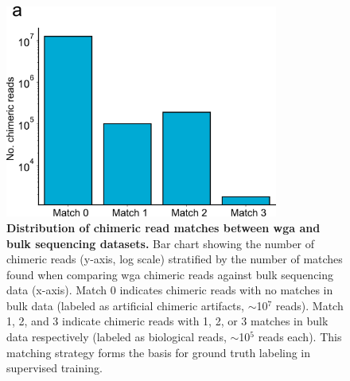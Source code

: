 \documentclass[pdflatex,sn-nature]{sn-jnl}%
\theoremstyle{thmstyleone}%
\theoremstyle{thmstyletwo}%
\theoremstyle{thmstylethree}%
\begin{document}
\begin{figure}[!ht]
	\begin{center}
		\includegraphics[width=0.8\textwidth]{final_figures/sf1}
	\end{center}
	\caption{{\bf Distribution of chimeric read matches between \gls{wga} and bulk sequencing datasets.}
		Bar chart showing the number of chimeric reads (y-axis, log scale) stratified by the number of matches found when comparing \gls{wga} chimeric reads against bulk sequencing data (x-axis). Match 0 indicates chimeric reads with no matches in bulk data (labeled as artificial chimeric artifacts, $\sim$10$^7$ reads). Match 1, 2, and 3 indicate chimeric reads with 1, 2, or 3 matches in bulk data respectively (labeled as biological reads, $\sim$10$^5$ reads each). This matching strategy forms the basis for ground truth labeling in supervised training.}\label{fig:sf1}
\end{figure}
\end{document}
